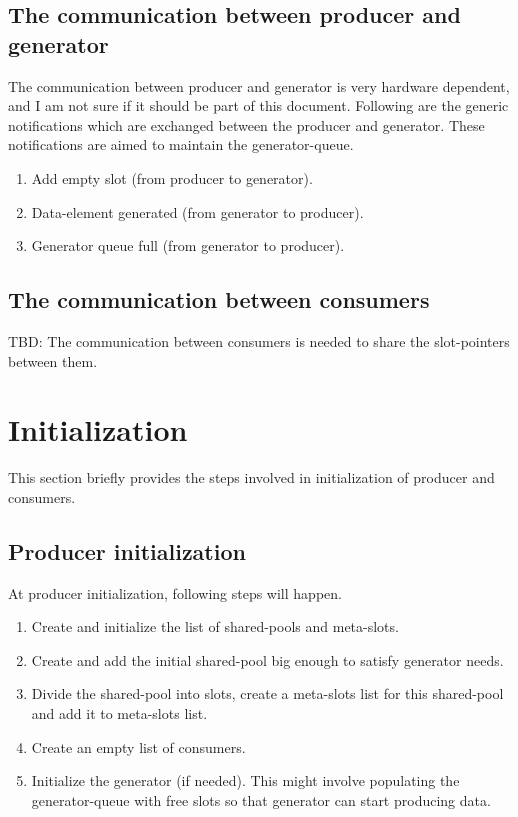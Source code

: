 \documentclass[a4paper,twoside]{report} %
\begin{document}
\subsection{The communication between producer and generator}
The communication between producer and generator is very
hardware dependent, and I am not sure if it should be part of this
document.  Following are the generic notifications which are exchanged
between the producer and generator.  These notifications are aimed to
maintain the generator-queue.

\begin{enumerate} 
  \item Add empty slot (from producer to generator). 
  \item Data-element generated (from generator to producer).
  \item Generator queue full (from generator to producer).
\end{enumerate} 

\subsection{The communication between consumers}
TBD:  The communication between consumers is needed to share the
slot-pointers between them.

\section{Initialization}
\label{sec:initialization}
This section briefly provides the steps involved in initialization of
producer and consumers.

\subsection{Producer initialization}
At producer initialization, following steps will happen.
\begin{enumerate} 
  \item Create and initialize the list of shared-pools and meta-slots.
  \item Create and add the initial shared-pool big enough to satisfy 
  generator needs.  
  \item Divide the shared-pool into slots, create a meta-slots list
  for this shared-pool and add it to meta-slots list.
  \item Create an empty list of consumers.
  \item Initialize the generator (if needed).  This might involve
  populating the generator-queue with free slots so that generator can
  start producing data.
\end{enumerate} 
\end{document}
